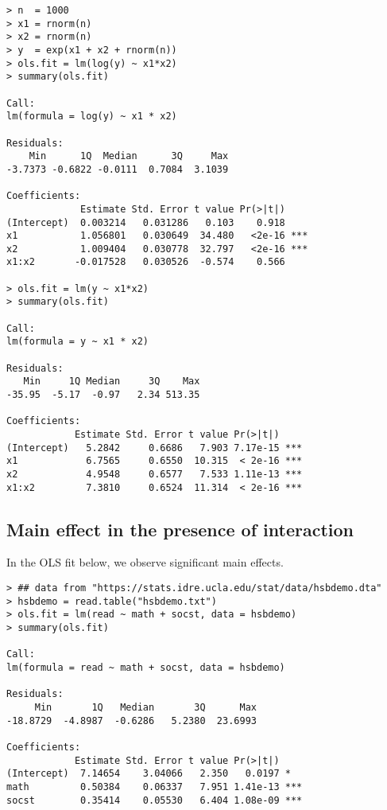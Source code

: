 \begin{lstlisting}
> n  = 1000
> x1 = rnorm(n)
> x2 = rnorm(n)
> y  = exp(x1 + x2 + rnorm(n))
> ols.fit = lm(log(y) ~ x1*x2)
> summary(ols.fit)

Call:
lm(formula = log(y) ~ x1 * x2)

Residuals:
    Min      1Q  Median      3Q     Max 
-3.7373 -0.6822 -0.0111  0.7084  3.1039 

Coefficients:
             Estimate Std. Error t value Pr(>|t|)    
(Intercept)  0.003214   0.031286   0.103    0.918    
x1           1.056801   0.030649  34.480   <2e-16 ***
x2           1.009404   0.030778  32.797   <2e-16 ***
x1:x2       -0.017528   0.030526  -0.574    0.566    

> ols.fit = lm(y ~ x1*x2)
> summary(ols.fit)

Call:
lm(formula = y ~ x1 * x2)

Residuals:
   Min     1Q Median     3Q    Max 
-35.95  -5.17  -0.97   2.34 513.35 

Coefficients:
            Estimate Std. Error t value Pr(>|t|)    
(Intercept)   5.2842     0.6686   7.903 7.17e-15 ***
x1            6.7565     0.6550  10.315  < 2e-16 ***
x2            4.9548     0.6577   7.533 1.11e-13 ***
x1:x2         7.3810     0.6524  11.314  < 2e-16 ***
\end{lstlisting}


\subsection{Main effect in the presence of interaction}\label{sec::main-interaction-centering}

In the OLS fit below, we observe significant main effects.
\begin{lstlisting}
> ## data from "https://stats.idre.ucla.edu/stat/data/hsbdemo.dta"
> hsbdemo = read.table("hsbdemo.txt")
> ols.fit = lm(read ~ math + socst, data = hsbdemo)
> summary(ols.fit)

Call:
lm(formula = read ~ math + socst, data = hsbdemo)

Residuals:
     Min       1Q   Median       3Q      Max 
-18.8729  -4.8987  -0.6286   5.2380  23.6993 

Coefficients:
            Estimate Std. Error t value Pr(>|t|)    
(Intercept)  7.14654    3.04066   2.350   0.0197 *  
math         0.50384    0.06337   7.951 1.41e-13 ***
socst        0.35414    0.05530   6.404 1.08e-09 ***
\end{lstlisting}

